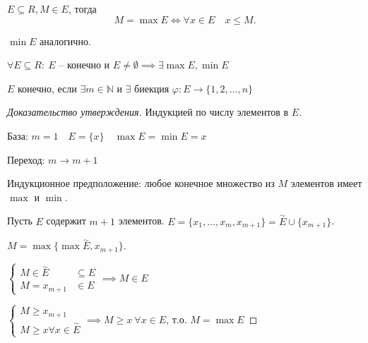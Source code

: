 \documentclass{book}
\newcommand\N{\ensuremath{\mathbb{N}}}
\renewcommand\O{\ensuremath{\emptyset}}
\renewcommand\phi{\varphi}
\theoremstyle{definition}
\begin{document}
    \begin{definition}
        $E\subseteq R, M\in E$, тогда 
        \[ M = \max E \iff  \forall x\in E\quad x\leqslant M. \] 

        $\min E$ аналогично.
    \end{definition}

    \begin{statement}
        $\forall E\subseteq R:\ E$ -- конечно и $E\neq \O \implies \exists \max E, \min E$
    \end{statement}
    \begin{definition}
        $E$ конечно, если $\exists  m\in \N $ и $\exists $ биекция $\phi:E \to \{1, 2, \ldots, n\}$
    \end{definition}
    \begin{proof}
        [Доказательство утверждения]
        Индукцией по числу элементов в $E$.

        База: $m=1\quad E = \{x\}\quad \max E = \min E  = x$

        Переход: $m\to m+1$

        Индукционное предположение: любое конечное множество из $M$ элементов имеет $\max$ и $\min$.

        Пусть $E$ содержит $m+1$ элементов.
        $E = \{x_1, \ldots, x_{m}, x_{m+1} \} = \overset{\sim }E \cup \{x_{m+1}\}$.

        $M = \max \{\max \overset{\sim }E, x_{m+1}\}$.

        $\begin{cases}
            M\in \overset{\sim }E&\subseteq E\\
            M = x_{m+1}&\in E
        \end{cases} \implies M\in E$

        $\begin{cases}
            M\geqslant x_{m+1}\\
            M\geqslant x \forall x\in \overset{\sim }E
        \end{cases} \implies  M\geqslant x\ \forall x\in E$, т.о. $M = \max E$
    \end{proof}
\end{document}
